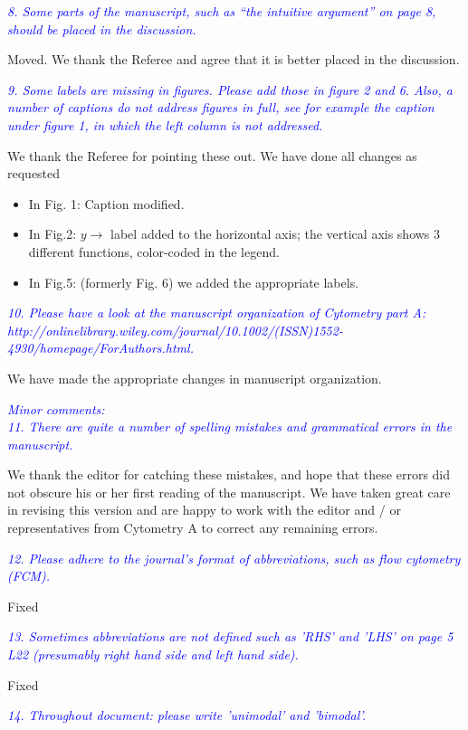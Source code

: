 \documentclass[letter,11pt,draft]{article}
\newcommand{\re}[1]{\emph{\textcolor{blue}{#1}}}
\begin{document}
\re{
8. Some parts of the manuscript, such as “the intuitive argument” on page 8, should be placed in the discussion.}

\smallskip
Moved. We thank the Referee and agree that it is better placed in the discussion.

\re{
9. Some labels are missing in figures. Please add those in figure 2 and 6. Also, a number of captions do not address figures in full, see for example the caption under figure 1, in which the left column is not addressed.}

\smallskip
We thank the Referee for pointing these out. We have done all changes as requested

\smallskip
\begin{itemize}
\item In Fig. 1: Caption  modified.
\item In Fig.2: $y\longrightarrow$ label added to the horizontal axis; the vertical axis shows 3 different functions, color-coded in the legend.
\item In Fig.5: (formerly Fig. 6) we added the appropriate labels.
\end{itemize}

\re{
10. Please have a look at the manuscript organization of Cytometry part A: http://onlinelibrary.wiley.com/journal/10.1002/(ISSN)1552-4930/homepage/ForAuthors.html.
}

\smallskip
We have made the appropriate changes in manuscript organization. 

\smallskip
\re{
Minor comments:
\\
11. There are quite a number of spelling mistakes and grammatical errors in the manuscript.}

\smallskip
We thank the editor for catching these mistakes, and hope that these errors did not obscure his or her first reading of the manuscript. We have taken great care in revising this version and are happy to work with the editor and / or representatives from Cytometry A to correct any remaining errors.

\re{
12. Please adhere to the journal's format of abbreviations, such as flow cytometry (FCM).}

\smallskip
Fixed

\re{
13. Sometimes abbreviations are not defined such as 'RHS' and 'LHS' on page 5 L22 (presumably right hand side and left hand side).}

\smallskip
Fixed

\re{
14. Throughout document: please write 'unimodal' and 'bimodal'.
}
\end{document}
